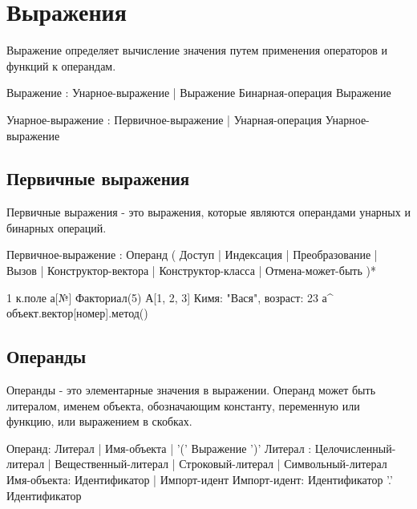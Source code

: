 \hypertarget{expressions}{%
\section{Выражения}\label{expr:chapter}}

Выражение определяет вычисление значения путем применения операторов и функций к операндам. 

\begin{Grammar}
Выражение
    : Унарное-выражение
	| Выражение Бинарная-операция Выражение

Унарное-выражение
	: Первичное-выражение
	| Унарная-операция Унарное-выражение
\end{Grammar}    

\hypertarget{primary-expr}{%
\subsection{Первичные выражения}\label{expr:primary-expr}}

Первичные выражения - это выражения, которые являются операндами унарных и бинарных операций.

\begin{Grammar}
Первичное-выражение
    : Операнд
	( Доступ
	| Индексация
	| Преобразование
	| Вызов
	| Конструктор-вектора
	| Конструктор-класса
	| Отмена-может-быть
	)*
\end{Grammar}    

\begin{Trivil}
1
к.поле
а[№]
Факториал(5)
А[1, 2, 3]
К{имя: "Вася", возраст: 23}
а^
объект.вектор[номер].метод()
\end{Trivil}

\hypertarget{operands}{%
\subsection{Операнды}\label{expr:operands}}

Операнды - это элементарные значения в выражении. Операнд может быть литералом, именем объекта, 
обозначающим константу, переменную или функцию, или выражением в скобках.

\begin{Grammar}
Операнд: Литерал | Имя-объекта | '(' Выражение ')'
Литерал
    : Целочисленный-литерал
    | Вещественный-литерал
    | Строковый-литерал
    | Символьный-литерал
Имя-объекта: Идентификатор | Импорт-идент
Импорт-идент: Идентификатор '.' Идентификатор
\end{Grammar}    

